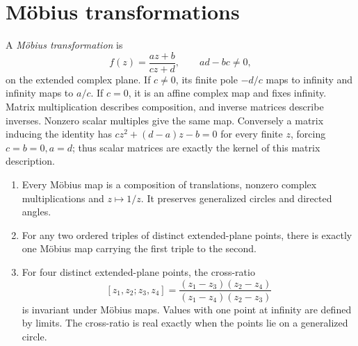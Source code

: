 \section{M\"obius transformations}

A \emph{M\"obius transformation} is
\[
f(z)=\frac{az+b}{cz+d},\qquad ad-bc\ne0,
\]
on the extended complex plane. If $c\ne0$, its finite pole $-d/c$ maps to infinity and infinity maps to $a/c$. If $c=0$, it is an affine complex map and fixes infinity. Matrix multiplication describes composition, and inverse matrices describe inverses. Nonzero scalar multiples give the same map. Conversely a matrix inducing the identity has $cz^2+(d-a)z-b=0$ for every finite $z$, forcing $c=b=0,a=d$; thus scalar matrices are exactly the kernel of this matrix description.

\begin{theorem}\label{geometry:thm:mobius}
\begin{enumerate}
\item Every M\"obius map is a composition of translations, nonzero complex multiplications and $z\mapsto1/z$. It preserves generalized circles and directed angles.
\item For any two ordered triples of distinct extended-plane points, there is exactly one M\"obius map carrying the first triple to the second.
\item For four distinct extended-plane points, the cross-ratio
\[
[z_1,z_2;z_3,z_4]=
\frac{(z_1-z_3)(z_2-z_4)}{(z_1-z_4)(z_2-z_3)}
\]
is invariant under M\"obius maps. Values with one point at infinity are defined by limits. The cross-ratio is real exactly when the points lie on a generalized circle.
\end{enumerate}
\end{theorem}
